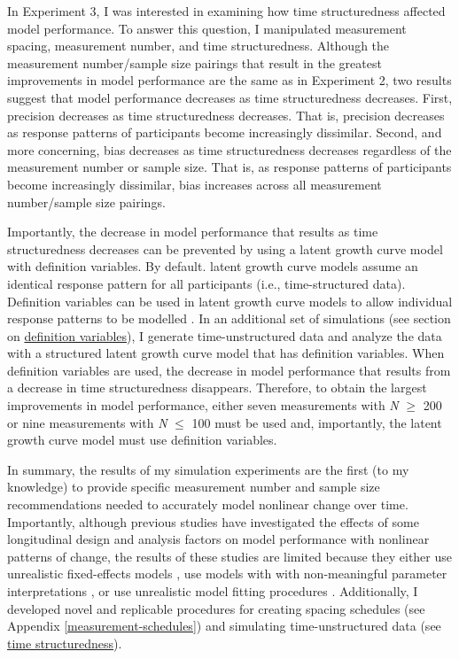 \documentclass[
12pt, %
twoside,
english]{guelphthesis}
\begin{document}
In Experiment 3, I was interested in examining how time structuredness affected model performance. To answer this question, I manipulated measurement spacing, measurement number, and time structuredness. Although the measurement number/sample size pairings that result in the greatest improvements in model performance are the same as in Experiment 2, two results suggest that model performance decreases as time structuredness decreases. First, precision decreases as time structuredness decreases. That is, precision decreases as response patterns of participants become increasingly dissimilar. Second, and more concerning, bias decreases as time structuredness decreases regardless of the measurement number or sample size. That is, as response patterns of participants become increasingly dissimilar, bias increases across all measurement number/sample size pairings.

Importantly, the decrease in model performance that results as time structuredness decreases can be prevented by using a latent growth curve model with definition variables. By default. latent growth curve models assume an identical response pattern for all participants (i.e., time-structured data). Definition variables can be used in latent growth curve models to allow individual response patterns to be modelled \autocite{metha2000,mehta2005}. In an additional set of simulations (see section on \protect\hyperlink{def-variables}{definition variables}), I generate time-unstructured data and analyze the data with a structured latent growth curve model that has definition variables. When definition variables are used, the decrease in model performance that results from a decrease in time structuredness disappears. Therefore, to obtain the largest improvements in model performance, either seven measurements with \emph{N} \(\ge\) 200 or nine measurements with \emph{N} \(\le\) 100 must be used and, importantly, the latent growth curve model must use definition variables.

In summary, the results of my simulation experiments are the first (to my knowledge) to provide specific measurement number and sample size recommendations needed to accurately model nonlinear change over time. Importantly, although previous studies have investigated the effects of some longitudinal design and analysis factors on model performance with nonlinear patterns of change, the results of these studies are limited because they either use unrealistic fixed-effects models \autocite[e.g.,][]{finch2017}, use models with with non-meaningful parameter interpretations \autocites[e.g.,][]{fine2019,liu2022}, or use unrealistic model fitting procedures \autocite{finch2017}. Additionally, I developed novel and replicable procedures for creating spacing schedules (see Appendix \ref{measurement-schedules}) and simulating time-unstructured data (see \protect\hyperlink{simulating-time-struc}{time structuredness}).
\end{document}
